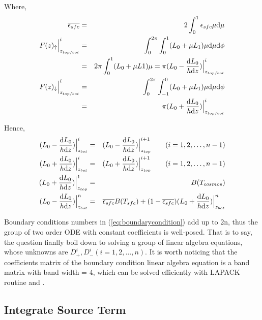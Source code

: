 Where,
\begin{eqnarray} \label{eq:epsilonbar}
    \overline{\epsilon_{sfc}} & = & 2\int_{0}^{1}\epsilon_{sfc}\mu \mathrm{d} \mu \nonumber\\
    F(z)_{\uparrow}\Big|_{z_{top/bot}}^{i} & = & \int_{0}^{2\pi}\int_{0}^{1}(L_{0} + \mu L_{1})\mu\mathrm{d}\mu\mathrm{d}\phi \nonumber\\
    {} & = & 2\pi\int_{0}^{1}(L_{0}+ \mu L{1})\mu = \pi (L_{0} - \frac{\mathrm{d} L_{0}}{h \mathrm{d} z})\Big|_{z_{top/bot}}^{i} \nonumber\\
    F(z)_{\downarrow}\Big|_{z_{top/bot}}^{i} & = & \int_{0}^{2\pi}\int_{-1}^{0}(L_{0} + \mu L_{1})\mu\mathrm{d}\mu\mathrm{d}\phi \nonumber\\
    {} & = & \pi (L_{0} + \frac{\mathrm{d} L_{0}}{h \mathrm{d} z})\Big|_{z_{top/bot}}^{i}
\end{eqnarray}

Hence,
\begin{eqnarray} \label{eq:boundarycondition} 
    (L_{0} - \frac{\mathrm{d} L_{0}}{h \mathrm{d} z})\Big|_{z_{bot}}^{i} & = & (L_{0} - \frac{\mathrm{d} L_{0}}{h \mathrm{d} z})\Big|_{z_{top}}^{i+1} \qquad (i=1,2,\ldots,n-1) \nonumber\\
    (L_{0} + \frac{\mathrm{d} L_{0}}{h \mathrm{d} z})\Big|_{z_{bot}}^{i} & = & (L_{0} + \frac{\mathrm{d} L_{0}}{h \mathrm{d} z})\Big|_{z_{top}}^{i+1} \qquad (i=1,2,\ldots,n-1) \nonumber\\
    (L_{0} + \frac{\mathrm{d} L_{0}}{h \mathrm{d} z})\Big|_{z_{top}}^{1} & = & B(T_{cosmos}) \nonumber\\
    (L_{0} - \frac{\mathrm{d} L_{0}}{h \mathrm{d} z})\Big|_{z_{bot}}^{n} & = & \overline{\epsilon_{sfc}} B(T_{sfc}) 
    + (1-\overline{\epsilon_{sfc}}) (L_{0} + \frac{\mathrm{d} L_{0}}{h \mathrm{d} z})\Big|_{z_{bot}}^{n}  
\end{eqnarray}

Boundary conditions numbers in (\ref{eq:boundarycondition}) add up to 2n, 
thus the group of two order ODE with constant coefficients is well-posed.
That is to say, the question fianlly boil down to solving a group of linear algebra equations, 
whose unknowns are $D_{+}^{i}, D_{-}^{i}(i=1, 2, \ldots, n)$.
It is worth noticing that the coefficients matrix of the boundary condition linear algebra equation
is a band matrix with band width = 4, which can be solved efficiently with LAPACK routine  and .

\subsection{Integrate Source Term}

